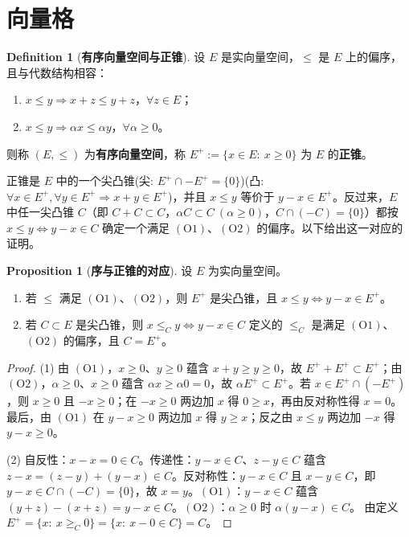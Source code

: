 \documentclass[oneside]{book}
\theoremstyle{definition}
\theoremstyle{definition}
\newtheorem{proposition}{Proposition}[section]
\newtheorem{definition}{Definition}[section]
\begin{document}
	
	
	\section{向量格}
	
	
	
	\begin{definition}[\bfseries{有序向量空间与正锥}]
		设 $E$ 是实向量空间，$\leqslant$ 是 $E$ 上的偏序，且与代数结构相容：
		\begin{enumerate}[label=(O\arabic*),leftmargin=2.8em,itemsep=0.1em,topsep=0.3em]
			\item $x\leqslant y \Rightarrow x+z\leqslant y+z$，$\forall z\in E$；
			\item $x\leqslant y \Rightarrow \alpha x\leqslant\alpha y$，$\forall\alpha\geqslant0$。
		\end{enumerate}
		则称 $(E,\leqslant)$ 为\textbf{有序向量空间}，称 $E^{+}:=\{x\in E:\ x\geqslant0\}$ 为 $E$ 的\textbf{正锥}。
	\end{definition}
	
	正锥是 $E$ 中的一个尖凸锥(尖: $E^+\cap -E^+=\{0\}$)(凸: $ \forall x\in E^+,\forall y\in E^+\Rightarrow x+y\in E^+$)，并且 $x\leqslant y$ 等价于 $y-x\in E^{+}$。反过来，$E$ 中任一尖凸锥 $C$（即 $C+C\subset C$，$\alpha C\subset C\ (\alpha\geqslant0)$，$C\cap(-C)=\{0\}$）都按 $x\leqslant y\iff y-x\in C$ 确定一个满足 $(\mathrm{O}1)$、$(\mathrm{O}2)$ 的偏序。以下给出这一对应的证明。
	
	\begin{proposition}[\bfseries{序与正锥的对应}]
		设 $E$ 为实向量空间。
		\begin{enumerate}[label=(\arabic*),leftmargin=2.2em,itemsep=0.1em,topsep=0.3em]
			\item 若 $\leqslant$ 满足 $(\mathrm{O}1)$、$(\mathrm{O}2)$，则 $E^{+}$ 是尖凸锥，且 $x\leqslant y\iff y-x\in E^{+}$。
			\item 若 $C\subset E$ 是尖凸锥，则 $x\leqslant_{C}y\iff y-x\in C$ 定义的 $\leqslant_{C}$ 是满足 $(\mathrm{O}1)$、$(\mathrm{O}2)$ 的偏序，且 $C=E^{+}$。
		\end{enumerate}
	\end{proposition}
	
	\begin{proof}
		(1) 由 $(\mathrm{O}1)$，$x\geqslant0$、$y\geqslant0$ 蕴含 $x+y\geqslant y\geqslant0$，故 $E^{+}+E^{+}\subset E^{+}$；由 $(\mathrm{O}2)$，$\alpha\geqslant0$、$x\geqslant0$ 蕴含 $\alpha x\geqslant\alpha0=0$，故 $\alpha E^{+}\subset E^{+}$。若 $x\in E^{+}\cap(-E^{+})$，则 $x\geqslant0$ 且 $-x\geqslant0$；在 $-x\geqslant0$ 两边加 $x$ 得 $0\geqslant x$，再由反对称性得 $x=0$。
		最后，由 $(\mathrm{O}1)$ 在 $y-x\geqslant0$ 两边加 $x$ 得 $y\geqslant x$；反之由 $x\leqslant y$ 两边加 $-x$ 得 $y-x\geqslant0$。
		
		(2) 自反性：$x-x=0\in C$。传递性：$y-x\in C$、$z-y\in C$ 蕴含 $z-x=(z-y)+(y-x)\in C$。反对称性：$y-x\in C$ 且 $x-y\in C$，即 $y-x\in C\cap(-C)=\{0\}$，故 $x=y$。$(\mathrm{O}1)$：$y-x\in C$ 蕴含 $(y+z)-(x+z)=y-x\in C$。$(\mathrm{O}2)$：$\alpha\geqslant0$ 时 $\alpha(y-x)\in C$。
		由定义 $E^{+}=\{x:\ x\geqslant_{C}0\}=\{x:\ x-0\in C\}=C$。
	\end{proof}
	
\end{document}
